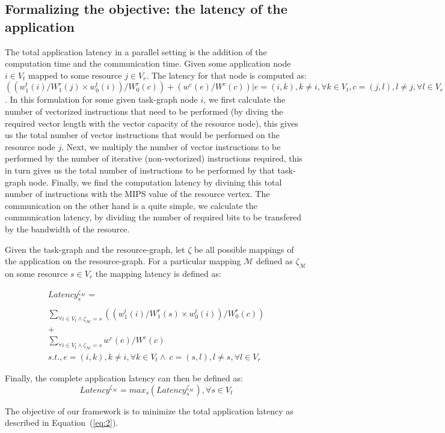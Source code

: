 \subsection{Formalizing the objective: the latency of the application}
\label{sec:form-latency-appl}

The total application latency in a parallel setting is the addition of
the computation time and the communication time. Given some application
node $i \in V_t$ mapped to some resource $j \in V_r$. The latency for
that node is computed as: $((w^t_1(i)/W^r_1(j)\times w^t_0(i))/W^r_0(c))
+ (w^e(e)/W^c(c)) | e = (i,k), k \neq i, \forall k \in V_t, c = (j,l), l
\neq j, \forall l \in V_r $. In this formulation for some given
task-graph node $i$, we first calculate the number of vectorized
instructions that need to be performed (by diving the required vector
length with the vector capacity of the resource node), this gives us the
total number of vector instructions that would be performed on the
resource node $j$. Next, we multiply the number of vector instructions
to be performed by the number of iterative (non-vectorized) instructions
required, this in turn gives us the total number of instructions to be
performed by that task-graph node. Finally, we find the computation
latency by divining this total number of instructions with the MIPS
value of the resource vertex. The communication on the other hand is a
quite simple, we calculate the communication latency, by dividing the
number of required bits to be transfered by the bandwidth of the
resource.

Given the task-graph and the resource-graph, let $\zeta$ be all possible
mappings of the application on the resource-graph. For a particular
mapping $\mathcal{M}$ defined as $\zeta_\mathcal{M}$ on some resource $s
\in V_r$ the mapping latency is defined as:

\begin{equation}
  \begin{array}{c}
    Latency^{\zeta_\mathcal{M}}_s = \\
    \\
    \sum_{\forall i \in V_t \wedge
      \zeta_\mathcal{M} = s} ((w^t_1(i)/W^r_1(s)\times w^t_0(i))/W^r_0(c))
    \\
    +
    \\
    \sum_{\forall i \in V_t \wedge
      \zeta_\mathcal{M} = s} w^e(e) / W^c(c)\\ 
    s.t., e = (i,k), k \neq i, \forall k
    \in V_t \wedge\  c = (s,l), l \neq s, \forall l \in V_r
  \end{array}
  \label{eq:1}
\end{equation}

Finally, the complete application latency can then be defined as: 
\begin{equation}
  \label{eq:2}
  Latency^{\zeta_\mathcal{M}} = max_{s}
  ({Latency^{\zeta_\mathcal{M}}_s}), \forall s \in V_t
\end{equation}

The objective of our framework is to minimize the total application
latency as described in Equation~(\ref{eq:2}).

